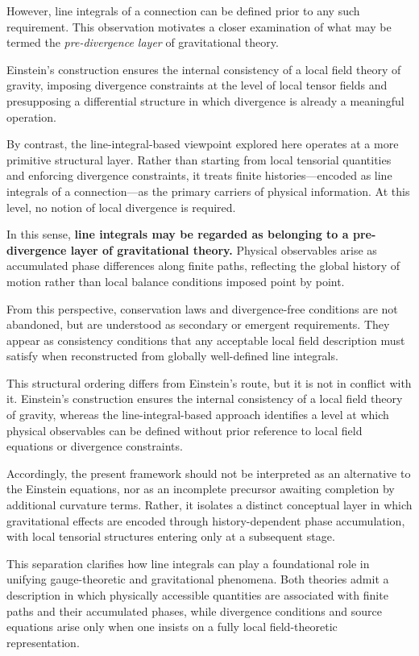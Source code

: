 \documentclass[12pt,letterpaper]{article}
\begin{document}
However, line integrals of a connection can be defined prior to any such requirement. This observation motivates a closer examination of what may be termed the \emph{pre-divergence layer} of gravitational theory.

Einstein's construction ensures the internal consistency of a local field theory of gravity, imposing divergence constraints at the level of local tensor fields and presupposing a differential structure in which divergence is already a meaningful operation.

By contrast, the line-integral-based viewpoint explored here operates at a more primitive structural layer.  
Rather than starting from local tensorial quantities and enforcing divergence constraints, it treats finite histories—encoded as line integrals of a connection—as the primary carriers of physical information.  
At this level, no notion of local divergence is required.

In this sense, \textbf{line integrals may be regarded as belonging to a pre-divergence layer of gravitational theory.} Physical observables arise as accumulated phase differences along finite paths, reflecting the global history of motion rather than local balance conditions imposed point by point.

From this perspective, conservation laws and divergence-free conditions are not abandoned, but are understood as secondary or emergent requirements. They appear as consistency conditions that any acceptable local field description must satisfy when reconstructed from globally well-defined line integrals.

This structural ordering differs from Einstein's route, but it is not in conflict with it. Einstein's construction ensures the internal consistency of a local field theory of gravity, whereas the line-integral-based approach identifies a level at which physical observables can be defined without prior reference to local field equations or divergence constraints.

Accordingly, the present framework should not be interpreted as an alternative to the Einstein equations, nor as an incomplete precursor awaiting completion by additional curvature terms. Rather, it isolates a distinct conceptual layer in which gravitational effects are encoded through history-dependent phase accumulation, with local tensorial structures entering only at a subsequent stage.

This separation clarifies how line integrals can play a foundational role in unifying gauge-theoretic and gravitational phenomena. Both theories admit a description in which physically accessible quantities are associated with finite paths and their accumulated phases, while divergence conditions and source equations arise only when one insists on a fully local field-theoretic representation.
\end{document}
